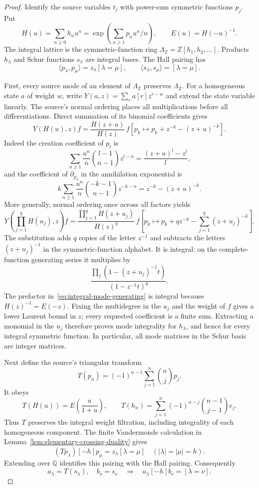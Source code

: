 \begin{proof}
Identify the source variables $t_j$ with power-sum symmetric
functions $p_j$. Put
\[
 H(u)=\sum_{n\ge0}h_nu^n
     =\exp\!\left(\sum_{n\ge1}p_nu^n/n\right),
 \qquad E(u)=H(-u)^{-1}.
\]
The integral lattice is the symmetric-function ring
$\Lambda_{\mathbb Z}=\mathbb Z[h_1,h_2,\ldots]$. Products
$h_\lambda$ and Schur functions $s_\lambda$ are integral bases.
The Hall pairing has
\[
 \langle p_\lambda,p_\mu\rangle
   =z_\lambda[\lambda=\mu],\qquad
 \langle s_\lambda,s_\mu\rangle=[\lambda=\mu].
\]

First, every source mode of an element of $\Lambda_{\mathbb Z}$
preserves $\Lambda_{\mathbb Z}$. For a homogeneous state $a$ of
weight $w$, write $Y(a,z)=\sum_r a[r]z^{r-w}$ and extend the
state variable linearly. The source's normal ordering places all
multiplications before all differentiations. Direct summation of
its binomial coefficients gives
\[
 Y(H(u),z)f
 =\frac{H(z+u)}{H(z)}\,
 f\left[p_k\mapsto p_k+z^{-k}-(z+u)^{-k}\right].
\]
Indeed the creation coefficient of $p_l$ is
\[
 \sum_{n\ge1}\frac{u^n}{n}\binom{l-1}{n-1}z^{l-n}
 =\frac{(z+u)^l-z^l}{l},
\]
and the coefficient of $\partial_{p_k}$ in the annihilation
exponential is
\[
 k\sum_{n\ge1}\frac{u^n}{n}\binom{-k-1}{n-1}z^{-k-n}
 =z^{-k}-(z+u)^{-k}.
\]
More generally, normal ordering once across all factors yields
\begin{equation}
\label{eq:integral-mode-generating}
 Y\!\left(\prod_{j=1}^qH(u_j),z\right)f
 =\frac{\prod_{j=1}^qH(z+u_j)}{H(z)^q}\,
 f\left[p_k\mapsto p_k+qz^{-k}
                       -\sum_{j=1}^q(z+u_j)^{-k}\right].
\end{equation}
The substitution adds $q$ copies of the letter $z^{-1}$ and
subtracts the letters $(z+u_j)^{-1}$ in the symmetric-function
alphabet. It is integral: on the complete-function generating
series it multiplies by
\[
 \frac{\prod_j(1-(z+u_j)^{-1}t)}{(1-z^{-1}t)^q}.
\]
The prefactor in~\eqref{eq:integral-mode-generating} is integral
because $H(z)^{-1}=E(-z)$. Fixing the multidegree in the $u_j$ and
the weight of $f$ gives a lower Laurent bound in $z$; every
requested coefficient is a finite sum. Extracting a monomial in
the $u_j$ therefore proves mode integrality for $h_\lambda$, and
hence for every integral symmetric function. In particular, all
mode matrices in the Schur basis are integer matrices.

Next define the source's triangular transform
\[
 T(p_n)=(-1)^{n-1}\sum_{j=1}^n\binom njp_j.
\]
It obeys
\[
 T(H(u))=E\!\left(\frac{u}{1+u}\right),\qquad
 T(h_n)=\sum_{j=1}^n(-1)^{n-j}\binom{n-1}{j-1}e_j.
\]
Thus $T$ preserves the integral weight filtration, including
integrality of each homogeneous component. The finite Vandermonde
calculation in Lemma~\ref{lem:elementary-crossing-duality} gives
\[
 (T p_\lambda)[-h]p_\mu=z_\lambda[\lambda=\mu]
 \quad (|\lambda|=|\mu|=h).
\]
Extending over $\mathbb Q$ identifies this pairing with the Hall
pairing. Consequently
\[
 a_\lambda=T(s_\lambda),\quad b_\nu=s_\nu
 \quad\Longrightarrow\quad
 a_\lambda[-h]b_\nu=[\lambda=\nu].
\]


\end{proof}
